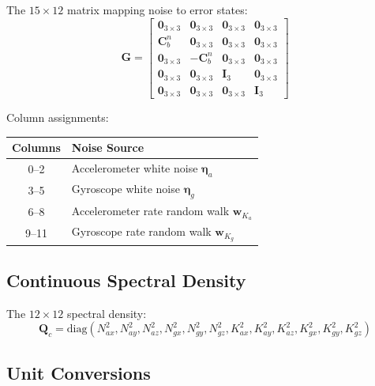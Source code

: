 \documentclass[11pt,a4paper]{article}
\newcommand{\mat}[1]{\mathbf{#1}}
\newcommand{\vect}[1]{\boldsymbol{#1}}
\begin{document}
The $15 \times 12$ matrix mapping noise to error states:
\begin{equation}
    \mat{G} = \begin{bmatrix}
        \mat{0}_{3\times3} & \mat{0}_{3\times3} & \mat{0}_{3\times3} & \mat{0}_{3\times3} \\
        \mat{C}_b^n & \mat{0}_{3\times3} & \mat{0}_{3\times3} & \mat{0}_{3\times3} \\
        \mat{0}_{3\times3} & -\mat{C}_b^n & \mat{0}_{3\times3} & \mat{0}_{3\times3} \\
        \mat{0}_{3\times3} & \mat{0}_{3\times3} & \mat{I}_{3} & \mat{0}_{3\times3} \\
        \mat{0}_{3\times3} & \mat{0}_{3\times3} & \mat{0}_{3\times3} & \mat{I}_{3}
    \end{bmatrix}
    \label{eq:G_matrix}
\end{equation}

Column assignments:
\begin{center}
\begin{tabular}{cl}
    \toprule
    Columns & Noise Source \\
    \midrule
    0--2 & Accelerometer white noise $\vect{\eta}_a$ \\
    3--5 & Gyroscope white noise $\vect{\eta}_g$ \\
    6--8 & Accelerometer rate random walk $\mat{w}_{K_a}$ \\
    9--11 & Gyroscope rate random walk $\mat{w}_{K_g}$ \\
    \bottomrule
\end{tabular}
\end{center}

\subsection{Continuous Spectral Density}

The $12 \times 12$ spectral density:
\begin{equation}
    \mat{Q}_c = \text{diag}\left(
        N_{ax}^2, N_{ay}^2, N_{az}^2,
        N_{gx}^2, N_{gy}^2, N_{gz}^2,
        K_{ax}^2, K_{ay}^2, K_{az}^2,
        K_{gx}^2, K_{gy}^2, K_{gz}^2
    \right)
    \label{eq:Qc}
\end{equation}

\subsection{Unit Conversions}
\end{document}
